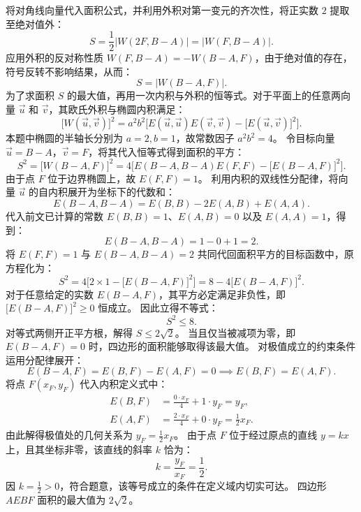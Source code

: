 \begin{solution}
将对角线向量代入面积公式，并利用外积对第一变元的齐次性，将正实数 $2$ 提取至绝对值外：
\[ S = \frac{1}{2} \big| W(2F, B-A) \big| = \big| W(F, B-A) \big|. \]
应用外积的反对称性质 $W(F, B-A) = -W(B-A, F)$，由于绝对值的存在，符号反转不影响结果，从而：
\[ S = \big| W(B-A, F) \big|. \]
为了求面积 $S$ 的最大值，再用一次内积与外积的恒等式。对于平面上的任意两向量 $\vec{u}$ 和 $\vec{v}$，其欧氏外积与椭圆内积满足：
\[ \big[W(\vec{u},\vec{v})\big]^2 = a^2 b^2 \Big[ E(\vec{u},\vec{u})E(\vec{v},\vec{v}) - \big[E(\vec{u},\vec{v})\big]^2 \Big]. \]
本题中椭圆的半轴长分别为 $a=2, b=1$，故常数因子 $a^2b^2 = 4$。
令目标向量 $\vec{u} = B-A$，$\vec{v} = F$，将其代入恒等式得到面积的平方：
\[ S^2 = \big[W(B-A, F)\big]^2 = 4 \Big[ E(B-A, B-A)E(F, F) - \big[E(B-A, F)\big]^2 \Big]. \]
由于点 $F$ 位于边界椭圆上，故 $E(F, F) = 1$。
利用内积的双线性分配律，将向量 $\vec{u}$ 的自内积展开为坐标下的代数和：
\[ E(B-A, B-A) = E(B, B) - 2E(A, B) + E(A, A). \]
代入前文已计算的常数 $E(B, B) = 1$、$E(A, B) = 0$ 以及 $E(A, A) = 1$，得到：
\[ E(B-A, B-A) = 1 - 0 + 1 = 2. \]
将 $E(F, F) = 1$ 与 $E(B-A, B-A) = 2$ 共同代回面积平方的目标函数中，原方程化为：
\[ S^2 = 4 \Big[ 2 \times 1 - \big[E(B-A, F)\big]^2 \Big] = 8 - 4\big[E(B-A, F)\big]^2. \]
对于任意给定的实数 $E(B-A, F)$，其平方必定满足非负性，即 $\big[E(B-A, F)\big]^2 \ge 0$ 恒成立。
因此立得不等式：
\[ S^2 \le 8. \]
对等式两侧开正平方根，解得 $S \le 2\sqrt{2}$。
当且仅当被减项为零，即 $E(B-A, F) = 0$ 时，四边形的面积能够取得该最大值。
对极值成立的约束条件运用分配律展开：
\[ E(B-A, F) = E(B, F) - E(A, F) = 0 \implies E(B, F) = E(A, F). \]
将点 $F(x_F, y_F)$ 代入内积定义式中：
\begin{align*}
E(B, F) &= \frac{0 \cdot x_F}{4} + 1 \cdot y_F = y_F, \\
E(A, F) &= \frac{2 \cdot x_F}{4} + 0 \cdot y_F = \frac{1}{2}x_F.
\end{align*}
由此解得极值处的几何关系为 $y_F = \frac{1}{2}x_F$。
由于点 $F$ 位于经过原点的直线 $y = kx$ 上，且其坐标非零，该直线的斜率 $k$ 恰为：
\[ k = \frac{y_F}{x_F} = \frac{1}{2}. \]
因 $k = \frac{1}{2} > 0$，符合题意，该等号成立的条件在定义域内切实可达。
四边形 $AEBF$ 面积的最大值为 $2\sqrt{2}$。
\end{solution}




